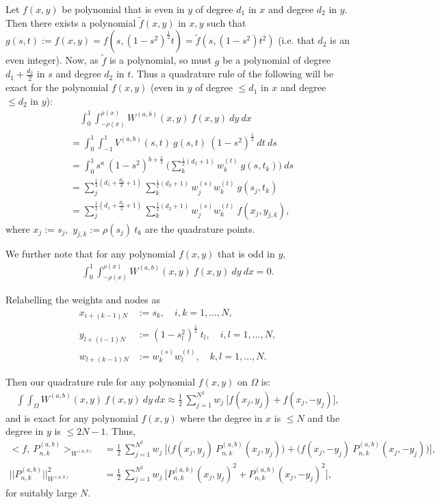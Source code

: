 \documentclass[11pt, oneside]{article}   	%
\newcommand{\half}{\frac{1}{2}}
\newcommand{\Pnk}{P_{n,k}}
\begin{document}
Let \(f(x,y)\) be polynomial that is even in \(y\) of degree $d_1$ in $x$ and degree $d_2$ in $y$. Then there exists a polynomial \(\tilde{f}(x,y)\) in \(x,y\) such that \(g(s,t) := f(x, y) = f(s, (1-s^2)^\half t) = \tilde{f}(s, (1-s^2) t^2)\) (i.e. that $d_2$ is an even integer). Now, as \(\tilde{f}\) is a polynomial, so must \(g\) be a polynomial of degree $d_1+\frac{d_2}{2}$ in $s$ and degree $d_2$ in $t$. Thus a quadrature rule of the following will be exact for the polynomial $f(x,y)$ (even in \(y\) of degree $\le d_1$ in $x$ and degree $\le d_2$ in $y$):
\begin{align}
& \quad \int_0^1 \int_{-\rho(x)}^{\rho(x)} W^{(a,b)}(x,y) \: f(x,y) \: dy \: dx \\
&= \int_0^1 \int_{-1}^1 V^{(a,b)}(s,t) \: g(s,t) \: (1-s^2)^\half \: dt \: ds \\
&= \int_0^1 s^a \: (1-s^2)^{b+\half} \: \Big( \sum_k^{\half(d_2 + 1)} w_k^{(t)} \: g(s, t_k) \Big) \: ds \\
&= \sum_j^{\half(d_1 + \frac{d_2}{2} + 1)} \sum_k^{\half(d_2 + 1)} w_j^{(s)} w_k^{(t)} \: g(s_j, t_k) \\
&= \sum_j^{\half(d_1 + \frac{d_2}{2} + 1)} \sum_k^{\half(d_2 + 1)} w_j^{(s)} w_k^{(t)} \: f(x_j, y_{j,k}),
\end{align}
where \(x_j := s_j,\) \(y_{j,k} := \rho(s_j) \: t_k\) are the quadrature points.

We further note that for any polynomial \(f(x,y)\) that is odd in \(y\),
\begin{align}
\int_0^1 \int_{-\rho(x)}^{\rho(x)} W^{(a,b)}(x,y) \: f(x,y) \: dy \: dx = 0.
\end{align}

Relabelling the weights and nodes as 
\begin{align}
x_{i+(k-1)N} &:= s_k, \quad i,k = 1,\dots,N, \\
y_{l+(i-1)N} &:= (1-s_l^2)^\half \: t_l, \quad i,l = 1,\dots,N, \\
w_{l+(k-1)N} &:= w_k^{(s)} w_l^{(t)}, \quad k,l = 1,\dots,N.
\end{align}

Then our quadrature rule for any polynomial \(f(x,y)\) on \(\Omega\) is:
\begin{align}
\int \int_\Omega W^{(a,b)}(x,y) \: f(x,y) \: dy \: dx \approx \half \: \sum_{j=1}^{N^2} w_j \: \big[ f(x_j, y_j) + f(x_j, -y_j) \big],
\end{align}
and is exact for any polynomial $f(x,y)$ where the degree in $x$ is $\le N$ and the degree in $y$ is $\le 2N-1$. Thus,
\begin{align}
< f, \: \Pnk^{(a,b)} >_{W^{(a,b)}} &= \half \: \sum_{j=1}^{N^2} w_j \: \big[ \big(f(x_j, y_j) \: \Pnk^{(a,b)}(x_j, y_j)\big) +\big(f(x_j, -y_j) \: \Pnk^{(a,b)}(x_j, -y_j)\big) \big], \\
|| \Pnk^{(a,b)} ||_{W^{(a,b)}}^2 &= \half \: \sum_{j=1}^{N^2} w_j \: \big[ \Pnk^{(a,b)}(x_j, y_j)^2 + \Pnk^{(a,b)}(x_j, -y_j)^2 \big],
\end{align}
for suitably large $N$.
\end{document}
